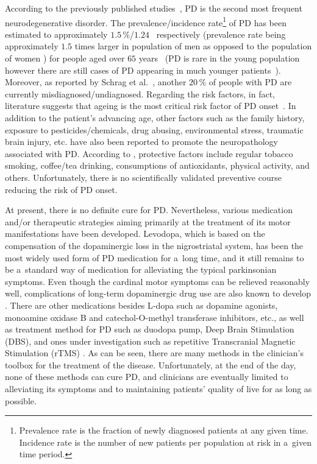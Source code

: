 According to the previously published studies~\cite{Rijk2000}, PD is the second most frequent neurodegenerative disorder. The prevalence/incidence rate\footnote{Prevalence rate is the fraction of newly diagnosed patients at any given time. Incidence rate is the number of new patients per population at risk in a~given time period.} of PD has been estimated to approximately $1.5\,\%$/$1.24$~\cite{Savica2016} respectively (prevalence rate being approximately $1.5$ times larger in population of men as opposed to the population of women \cite{Baldereschi2000, Haaxma2007}) for people aged over $65$ years~\cite{Rijk1997} (PD is rare in the young population however there are still cases of PD appearing in much younger patients~\cite{Colcher1999}). Moreover, as reported by Schrag et al.~\cite{Schrag2002}, another $20\,\%$ of people with PD are currently misdiagnosed/undiagnosed. Regarding the risk factors, in fact, literature suggests that ageing is the most critical risk factor of PD onset~\cite{Elbaz2002}. In addition to the patient's advancing age, other factors such as the family history, exposure to pesticides/chemicals, drug abusing, environmental stress, traumatic brain injury, etc. have also been reported to promote the neuropathology associated with PD. According to \cite{Hernan2002, Ascherio2016}, protective factors include regular tobacco smoking, coffee/tea drinking, consumptions of antioxidants, physical activity, and others. Unfortunately, there is no scientifically validated preventive course reducing the risk of PD onset.

At present, there is no definite cure for PD. Nevertheless, various medication and/or therapeutic strategies aiming primarily at the treatment of its motor manifestations have been developed. Levodopa, which is based on the compensation of the dopaminergic loss in the nigrostriatal system, has been the most widely used form of PD medication for a~long time, and it still remains to be a~standard way of medication for alleviating the typical parkinsonian symptoms. Even though the cardinal motor symptoms can be relieved reasonably well, complications of long-term dopaminergic drug use are also known to develop \cite{Grosset2009, Gardian2010}. There are other medications besides L-dopa such as dopamine agonists, monoamine oxidase B and catechol-O-methyl transferase inhibitors, etc., as well as treatment method for PD such as duodopa pump, Deep Brain Stimulation (DBS), and ones under investigation such as repetitive Transcranial Magnetic Stimulation (rTMS) \cite{Herzog2003, Rodriguez2005, Benabid2009, Deuschl2006}. As can be seen, there are many methods in the clinician's toolbox for the treatment of the disease. Unfortunately, at the end of the day, none of these methods can cure PD, and clinicians are eventually limited to alleviating its symptoms and to maintaining patients' quality of live for as long as possible.

